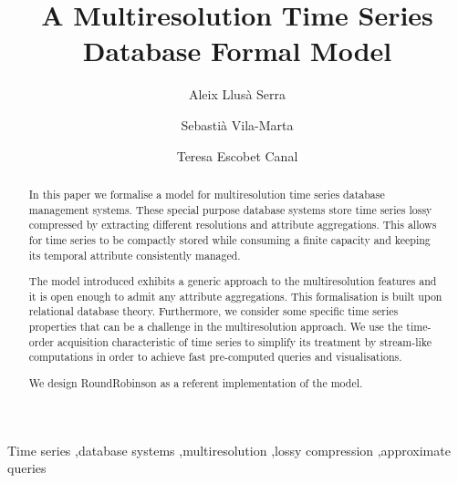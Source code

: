 \documentclass[
  review,
  twocolumn,
  5p,
  sort&compress,
]{elsarticle}
\begin{document}


\begin{frontmatter}

  \title{A Multiresolution Time Series \\ Database Formal Model}


  \author
  [dipse]
  {Aleix Llus\`{a} Serra}

  \author
  [dipse]
  {Sebasti\`{a} Vila-Marta
  }

  \author
  [dipse]
  {Teresa Escobet Canal
  }



  \address
  [dipse]
  {Department of Electronic System Design and Programming\\ Universitat Polit\`{e}cnica de Catalunya\\ Av.~Bases de Manresa 61--73, 08242 Manresa, ES-CT}



  \begin{abstract}

    In this paper we formalise a model for multiresolution time series
    database management systems. These special purpose database
    systems store time series lossy compressed by extracting different
    resolutions and attribute aggregations. This allows for time
    series to be compactly stored while consuming a finite capacity and
    keeping its temporal attribute consistently managed.
   
    The model introduced exhibits a generic approach to the
    multiresolution features and it is open enough to admit any
    attribute aggregations. This formalisation is built upon
    relational database theory.
    Furthermore, we consider some specific time series properties that
    can be a challenge in the multiresolution approach.  
    We use the time-order acquisition characteristic of time series to
    simplify its treatment by stream-like computations in order to
    achieve fast pre-computed queries and visualisations.
    
    We design RoundRobinson as a referent implementation of the model.
  \end{abstract}


  \begin{keyword}
    Time series \sep database systems \sep multiresolution \sep lossy
    compression \sep approximate queries
  \end{keyword}

\end{frontmatter}
\end{document}

